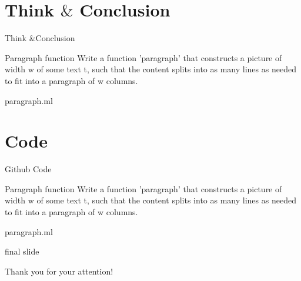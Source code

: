 \documentclass{beamer}
\begin{document}
\section{Think $\&$ Conclusion}
\begin{frame}{Think $\&$Conclusion}
	\begin{center}
		\begin{block}{Paragraph function}
			Write a function 'paragraph' that constructs a picture of width w of some text t, such that the content splits into as many lines as needed to fit into a paragraph of w columns. 
		\end{block}
		\begin{block}{paragraph.ml}
			{\small    }
		\end{block}
	\end{center}
\end{frame}

\section{Code}
\begin{frame}{Github Code}
\begin{center}
\begin{block}{Paragraph function}
 Write a function 'paragraph' that constructs a picture of width w of some text t, such that the content splits into as many lines as needed to fit into a paragraph of w columns. 
\end{block}
\begin{block}{paragraph.ml}
{\small    }
\end{block}
\end{center}
\end{frame}


\begin{frame}
 \begin{beamercolorbox}[wd=\paperwidth, ht=1.4cm,rounded=true,shadow=true]{final slide}
      \begin{center}
	{\huge Thank you for your attention!}
      \end{center}
 \end{beamercolorbox}
\end{frame}
\end{document}
